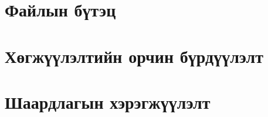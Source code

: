 \section{Файлын бүтэц}


\section{Хөгжүүлэлтийн орчин бүрдүүлэлт}


\section{Шаардлагын хэрэгжүүлэлт}

